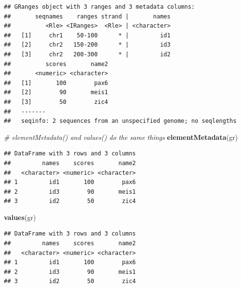 \documentclass[12pt,]{krantz}
\newenvironment{Shaded}{\begin{snugshade}}{\end{snugshade}}
\newcommand{\CommentTok}[1]{\textcolor[rgb]{0.56,0.35,0.01}{\textit{#1}}}
\newcommand{\KeywordTok}[1]{\textcolor[rgb]{0.13,0.29,0.53}{\textbf{#1}}}
\newcommand{\NormalTok}[1]{#1}
\newcommand{\OperatorTok}[1]{\textcolor[rgb]{0.81,0.36,0.00}{\textbf{#1}}}
\newcommand{\StringTok}[1]{\textcolor[rgb]{0.31,0.60,0.02}{#1}}
\begin{document}
\begin{verbatim}
## GRanges object with 3 ranges and 3 metadata columns:
##       seqnames    ranges strand |       names
##          <Rle> <IRanges>  <Rle> | <character>
##   [1]     chr1    50-100      * |         id1
##   [2]     chr2   150-200      * |         id3
##   [3]     chr2   200-300      * |         id2
##          scores       name2
##       <numeric> <character>
##   [1]       100        pax6
##   [2]        90       meis1
##   [3]        50        zic4
##   -------
##   seqinfo: 2 sequences from an unspecified genome; no seqlengths
\end{verbatim}

\begin{Shaded}
\begin{Highlighting}[]
\CommentTok{# elementMetadata() and values() do the same things}
\KeywordTok{elementMetadata}\NormalTok{(gr)}
\end{Highlighting}
\end{Shaded}

\begin{verbatim}
## DataFrame with 3 rows and 3 columns
##         names    scores       name2
##   <character> <numeric> <character>
## 1         id1       100        pax6
## 2         id3        90       meis1
## 3         id2        50        zic4
\end{verbatim}

\begin{Shaded}
\begin{Highlighting}[]
\KeywordTok{values}\NormalTok{(gr)}
\end{Highlighting}
\end{Shaded}

\begin{verbatim}
## DataFrame with 3 rows and 3 columns
##         names    scores       name2
##   <character> <numeric> <character>
## 1         id1       100        pax6
## 2         id3        90       meis1
## 3         id2        50        zic4
\end{verbatim}

\begin{Shaded}
\end{Shaded}
\end{document}
